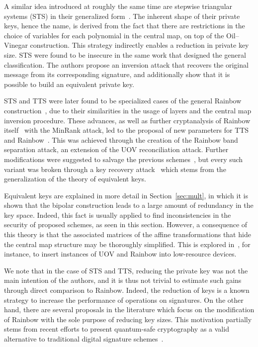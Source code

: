\documentclass[draft, 12pt, a4paper, oneside]{memoir}
\theoremstyle{definition}
\begin{document}
A similar idea introduced at roughly the same time are stepwise triangular systems (STS) in their generalized form~\cite{Wolf:200603}. The inherent shape of their private keys, hence the name, is derived from the fact that there are restrictions in the choice of variables for each polynomial in the central map, on top of the Oil--Vinegar construction. This strategy indirectly enables a reduction in private key size. STS were found to be insecure in the same work that designed the general classification. The authors propose an inversion attack that recovers the original message from its corresponding signature, and additionally show that it is possible to build an equivalent private key.

STS and TTS were later found to be specialized cases of the general Rainbow construction~\cite{Ding:200806}, due to their similarities in the usage of layers and the central map inversion procedure. These advances, as well as further cryptanalysis of Rainbow itself~\cite{Billet:200609} with the MinRank attack, led to the proposal of new parameters for TTS and Rainbow~\cite{Ding:200806}. This was achieved through the creation of the Rainbow band separation attack, an extension of the UOV reconciliation attack. Further modifications were suggested to salvage the previous schemes~\cite{Tsujii:201005}, but every such variant was broken through a key recovery attack~\cite{Thomae:201207} which stems from the generalization of the theory of equivalent keys.

Equivalent keys are explained in more detail in Section~\ref{sec:mult}, in which it is shown that the bipolar construction leads to a large amount of redundancy in the key space. Indeed, this fact is usually applied to find inconsistencies in the security of proposed schemes, as seen in this section. However, a consequence of this theory is that the associated matrices of the affine transformations that hide the central map structure may be thoroughly simplified. This is explored in~\cite{Czypek:201209}, for instance, to insert instances of UOV and Rainbow into low-resource devices.

We note that in the case of STS and TTS, reducing the private key was not the main intention of the authors, and it is thus not trivial to estimate such gains through direct comparison to Rainbow. Indeed, the reduction of keys is a known strategy to increase the performance of operations on signatures. On the other hand, there are several proposals in the literature which focus on the modification of Rainbow with the sole purpose of reducing key sizes. This motivation partially stems from recent efforts to present quantum-safe cryptography as a valid alternative to traditional digital signature schemes~\cite{Bernstein:2008}.
\end{document}
